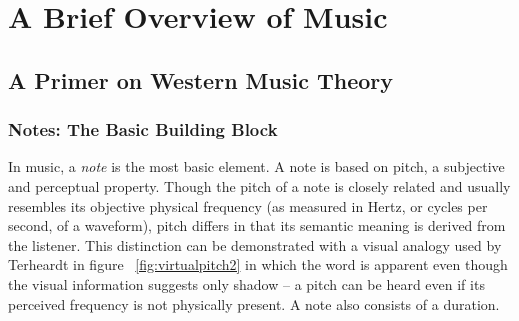 \chapter{A Brief Overview of Music}

\section{A Primer on Western Music Theory}

\subsection{Notes: The Basic Building Block}

In music, a \textit{note} is the most basic element. A note is based on pitch, a subjective and perceptual property. Though the pitch of a note is closely related and usually resembles its objective physical frequency (as measured in Hertz, or cycles per second, of a waveform), pitch differs in that its semantic meaning is derived from the listener. This distinction can be demonstrated with a visual analogy used by Terheardt\cite{terhardt1974pitch} in figure ~\ref{fig:virtualpitch2} in which the word  is apparent even though the visual information suggests only shadow -- a pitch can be heard even if its perceived frequency is not physically present. A note also consists of a duration.
